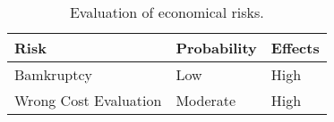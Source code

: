     \begin{table}[h]
\centering
    \begin{tabular}{| l | l | l |}
        \hline
        \textbf{Risk}                   & \textbf{Probability}  & \textbf{Effects}  \\
        \hline
        Bamkruptcy & Low & High \\
        \hline
        Wrong Cost Evaluation & Moderate & High \\
        \hline
    \end{tabular}
    \caption{Evaluation of economical risks.}
\end{table}
